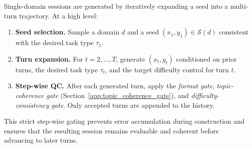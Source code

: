 Single-domain sessions are generated by iteratively expanding a seed into a multi-turn trajectory.
At a high level:
\begin{enumerate}
    \item \textbf{Seed selection.} Sample a domain $d$ and a seed $(x_1,y_1)\in \mathcal{S}(d)$ consistent with the desired task type $\tau_1$.
    \item \textbf{Turn expansion.} For $t=2,\ldots,T$, generate $(x_t,y_t)$ conditioned on prior turns, the desired task type $\tau_t$,     and the target difficulty control for turn $t$.
    \item \textbf{Step-wise QC.} After each generated turn, apply the \emph{format gate}, \emph{topic-coherence gate} (Section~\ref{app:topic_coherence_gate}), and \emph{difficulty-consistency gate}. Only accepted turns are appended to the history.
\end{enumerate}
This strict step-wise gating prevents error accumulation during construction and ensures that the resulting session remains evaluable and coherent before advancing to later turns.


